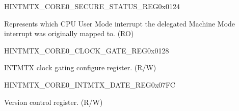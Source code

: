 \begin{register}{H}{INTMTX\_CORE0\_SECURE\_STATUS\_REG}{0x0124}\label{regdesc:INTMTXCORE0SECURESTATUSREG}
%
\regnewline%
\begin{regdesc}\begin{reglist}
\label{fielddesc:INTMTXCORE0INTSECURESTATUS}\item [INTMTX\_CORE0\_INT\_SECURE\_STATUS] Represents which CPU User Mode interrupt the delegated Machine Mode interrupt was originally mapped to. (RO)
\end{reglist}\end{regdesc}
\end{register}


\begin{register}{H}{INTMTX\_CORE0\_CLOCK\_GATE\_REG}{0x0128}\label{regdesc:INTMTXCORE0CLOCKGATEREG}
%
%
\regnewline%
\begin{regdesc}\begin{reglist}
\label{fielddesc:INTMTXCORE0REGCLKEN}\item [INTMTX\_CORE0\_REG\_CLK\_EN] INTMTX clock gating configure register. (R/W)
\end{reglist}\end{regdesc}
\end{register}


\begin{register}{H}{INTMTX\_CORE0\_INTMTX\_DATE\_REG}{0x07FC}\label{regdesc:INTMTXCORE0INTMTXDATEREG}
%
%
\regnewline%
\begin{regdesc}\begin{reglist}
\label{fielddesc:INTMTXCORE0INTMTXDATE}\item [INTMTX\_CORE0\_INTMTX\_DATE] Version control register. (R/W)
\end{reglist}\end{regdesc}
\end{register}


